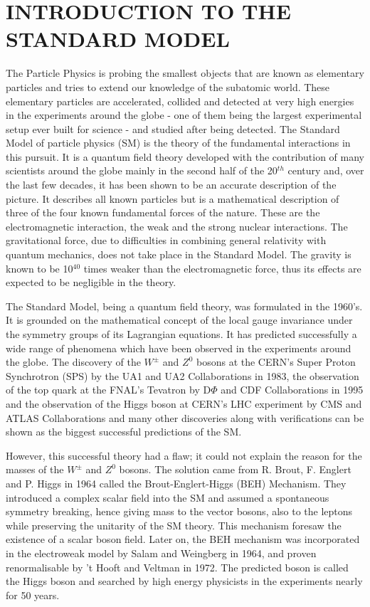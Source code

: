 \chapter{INTRODUCTION TO THE STANDARD MODEL}\label{Ch1}

The Particle Physics is probing the smallest objects that are known as elementary particles and tries to extend our knowledge of the subatomic world. These elementary particles are accelerated, collided and detected at very high energies in the experiments around the globe - one of them being the largest experimental setup ever built for science - and studied after being detected. The Standard Model of particle physics (SM) is the theory of the fundamental interactions in this pursuit. It is a quantum field theory developed with the contribution of many scientists around the globe mainly in the second half of the 20$^{th}$ century and, over the last few decades, it has been shown to be an accurate description of the picture. It describes all known particles but is a mathematical description of three of the four known fundamental forces of the nature. These are the electromagnetic interaction, the weak and the strong nuclear interactions. The gravitational force, due to difficulties in combining general relativity with quantum mechanics, does not take place in the Standard Model. The gravity is known to be 10$^{40}$ times weaker than the electromagnetic force, thus its effects are expected to be negligible in the theory.

The Standard Model, being a quantum field theory, was formulated in the 1960's. It is grounded on the mathematical concept of the local gauge invariance under the symmetry groups of its Lagrangian equations. It has predicted successfully a wide range of phenomena which have been observed in the experiments around the globe. The discovery of the $W^\pm$ and $Z^0$ bosons \cite{SPS-1, SPS-2, SPS-3, SPS-4, SPS-5} at the CERN's Super Proton Synchrotron (SPS) by the UA1 and UA2 Collaborations in 1983, the observation of the top quark at the FNAL's Tevatron by D$\Phi$ and CDF Collaborations\cite{fnal-1, fnal-2} in 1995 and the observation of the Higgs boson at CERN's LHC experiment\cite{HiggsCMS,HiggsATLAS} by CMS and ATLAS Collaborations and many other discoveries along with verifications can be shown as the biggest successful predictions of the SM.

However, this successful theory had a flaw; it could not explain the reason for the masses of the $W^\pm$ and $Z^0$ bosons. The solution came from R. Brout, F. Englert and P. Higgs in 1964 called the Brout-Englert-Higgs (BEH) Mechanism\cite{Higgs1964, BroutEnglert, Guralnik1964}. They introduced a complex scalar field into the SM and assumed a spontaneous symmetry breaking, hence giving mass to the vector bosons, also to the leptons while preserving the unitarity of the SM theory. This mechanism foresaw the existence of a scalar boson field. Later on, the BEH mechanism was incorporated in the electroweak model by Salam and Weingberg\cite{salam} in 1964, and proven renormalisable by 't Hooft and Veltman in 1972\cite{thooft}. The predicted boson is called the Higgs boson and searched by high energy physicists in the experiments nearly for 50 years.

